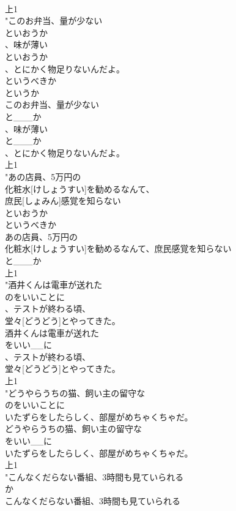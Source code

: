 \documentclass[8pt]{extreport}
\begin{document}
\begin{CJK}{UTF8}{min}
\\	上1
\\	"このお弁当、量が少ない
\\	といおうか
\\	、味が薄い
\\	といおうか
\\	、とにかく物足りないんだよ。
\\	というべきか
\\	というか
\\	このお弁当、量が少ない
\\	と___か
\\	、味が薄い
\\	と___か
\\	、とにかく物足りないんだよ。
\\	上1
\\	"あの店員、5万円の
\\	化粧水[けしょうすい]を勧めるなんて、
\\	庶民[しょみん]感覚を知らない
\\	といおうか
\\	というべきか
\\	あの店員、5万円の
\\	化粧水[けしょうすい]を勧めるなんて、庶民感覚を知らない
\\	と___か
\\	上1
\\	"酒井くんは電車が送れた
\\	のをいいことに
\\	、テストが終わる頃、
\\	堂々[どうどう]とやってきた。
\\	酒井くんは電車が送れた
\\	をいい__に
\\	、テストが終わる頃、
\\	堂々[どうどう]とやってきた。
\\	上1
\\	"どうやらうちの猫、飼い主の留守な
\\	のをいいことに
\\	いたずらをしたらしく、部屋がめちゃくちゃだ。
\\	どうやらうちの猫、飼い主の留守な
\\	をいい__に
\\	いたずらをしたらしく、部屋がめちゃくちゃだ。
\\	上1
\\	"こんなくだらない番組、3時間も見ていられる
\\	か
\\	こんなくだらない番組、3時間も見ていられる

\end{CJK}
\end{document}

